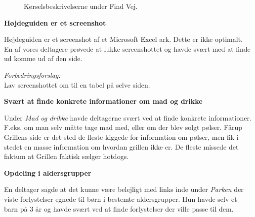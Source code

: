 \documentclass[10pt,a4paper]{article}      %
\newenvironment{forslag}{\emph{Forbedringsforslag:}\\[0.5mm]}{}
\newcommand\pic[1]{\texttt{[image: Pics/\#1]}}
\renewcommand\goodidea{\pic{goodidea}}
\renewcommand\smallproblem{\pic{smallproblem}}
\begin{document}
\begin{kommentarer}
\begin{figure}[htbp]
    \centering
    \caption{Kørselsbeskrivelserne under Find Vej.}
    \label{fig:koerselsbeskrivelse}
\end{figure}

\item[\smallproblem]{\textbf{Højdeguiden er et screenshot}}

Højdeguiden er et screenshot af et Microsoft Excel ark. Dette er ikke optimalt.
En af vores deltagere prøvede at lukke screenshottet og havde svært med at finde
ud komme ud af den side.

\begin{forslag}
Lav screenshottet om til en tabel på selve siden.
\end{forslag}

\item[\smallproblem] \textbf{Svært at finde konkrete informationer om mad og drikke}

Under \emph{Mad og drikke} havde deltagerne svært ved at finde konkrete
informationer. F.eks. om man selv måtte tage mad med, eller om der blev solgt
pølser. Fårup Grillens side er det sted de fleste kiggede for information om
pølser, men fik i stedet en masse information om hvordan grillen ikke er. De
fleste missede det faktum at Grillen faktisk sælger hotdogs.

\item[\goodidea] \textbf{Opdeling i aldersgrupper}

En deltager sagde at det kunne være belejligt med links inde under \emph{Parken} der viste
forlystelser egnede til børn i bestemte aldersgrupper. Hun havde selv et barn på 3 år og havde
svært ved at finde forlystelser der ville passe til dem.


\end{kommentarer}
\end{document}
